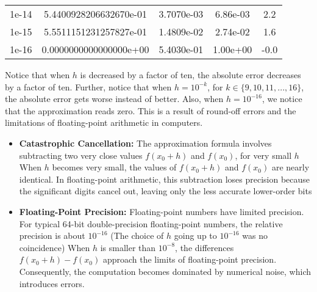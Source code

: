 \documentclass{report}
\begin{document}
\begin{itemize}
\begin{center}
\begin{tabular}{c|c|c|c|c}
                    1e-14   &5.4400928206632670e-01   &3.7070e-03   &6.86e-03      &2.2\\
                    1e-15   &5.5511151231257827e-01   &1.4809e-02   &2.74e-02      &1.6\\
                    1e-16   &0.0000000000000000e+00   &5.4030e-01   &1.00e+00     &-0.0
                \end{tabular}
            \end{center}
            \bigbreak \noindent 
            Notice that when $h$ is decreased by a factor of ten, the absolute error decreases by a factor of ten.
            \bigbreak \noindent 
            Further, notice that when $h = 10^{-k}$, for $k\in\{9,10,11,...,16\} $, the absolute error gets worse instead of better. Also, when $h=10^{-16}$, we notice that the approximation reads zero. This is a result of round-off errors and the limitations of floating-point arithmetic in computers.
            \begin{itemize}
                \item \textbf{Catastrophic Cancellation:} The approximation formula involves subtracting two very close values $f(x_{0} + h)$ and $f(x_{0}) $, for very small $h$
                    \bigbreak \noindent 
                    When $h$ becomes very small, the values of  $f(x_{0} + h)$ and $ f(x_{0})$ are nearly identical. In floating-point arithmetic, this subtraction loses precision because the significant digits cancel out, leaving only the less accurate lower-order bits
                \item \textbf{Floating-Point Precision:} Floating-point numbers have limited precision. For typical 64-bit double-precision floating-point numbers, the relative precision is about $10^{-16}$ (The choice of $h$ going up to $10^{-16} $ was no coincidence)
                    \bigbreak \noindent 
                    When $h$ is smaller than $10^{-8}$, the differences $f(x_{0} + h) - f(x_{0})$ approach the limits of floating-point precision. Consequently, the computation becomes dominated by numerical noise, which introduces errors.
 

\end{itemize}
\end{itemize}
\end{document}
